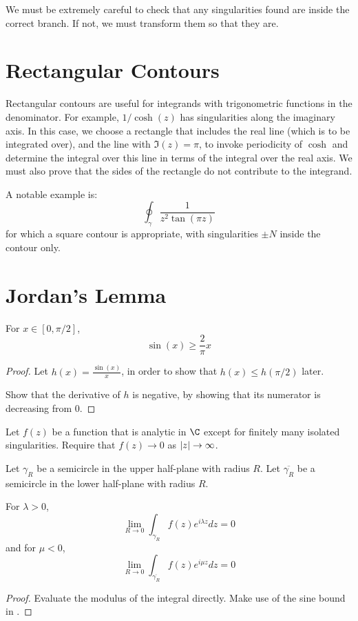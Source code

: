 \documentclass[../Main.tex]{subfiles}
\begin{document}
We must be extremely careful to check that any singularities found are inside the correct branch. If not, we must transform them so that they are.
\section{Rectangular Contours}
Rectangular contours are useful for integrands with trigonometric functions in the denominator. For example, $1 / \cosh(z)$ has singularities along the imaginary axis. In this case, we choose a rectangle that includes the real line (which is to be integrated over), and the line with $\Im(z) = \pi$, to invoke periodicity of $\cosh$ and determine the integral over this line in terms of the integral over the real axis. We must also prove that the sides of the rectangle do not contribute to the integrand.

A notable example is:
\begin{equation*}
    \oint_\gamma \frac{1}{z^2 \tan(\pi z)}
\end{equation*}
for which a square contour is appropriate, with singularities $\pm N$ inside the contour only.
\section{Jordan's Lemma}
\begin{lemma}
    For $x \in [0, \pi / 2]$,
    \begin{equation*}
        \sin(x) \geq \frac{2}{\pi}x
    \end{equation*}
    \label{lemSinBound}
\end{lemma}
\begin{proof}
    Let $h(x) = \frac{\sin(x)}{x}$, in order to show that $h(x) \leq h(\pi / 2)$ later.

    Show that the derivative of $h$ is negative, by showing that its numerator is decreasing from 0.
\end{proof}
\begin{theorem}
    Let $f(z)$ be a function that is analytic in $\C$ except for finitely many isolated singularities. Require that $f(z) \to 0$ as $\left|z\right| \to \infty$.

    Let $\gamma_R$ be a semicircle in the upper half-plane with radius $R$. Let $\overline{\gamma_R}$ be a semicircle in the lower half-plane with radius $R$.

    For $\lambda > 0$,
    \begin{equation*}
        \lim_{R \to 0} \int_{\gamma_R} f(z) e^{i \lambda z} dz = 0
    \end{equation*}
    and for $\mu < 0$,
    \begin{equation*}
        \lim_{R \to 0} \int_{\overline{\gamma_R}} f(z) e^{i \mu z} dz = 0
    \end{equation*}
    \label{thmJordan}
\end{theorem}
\begin{proof}
    Evaluate the modulus of the integral directly. Make use of the sine bound in .
\end{proof}
\end{document}
